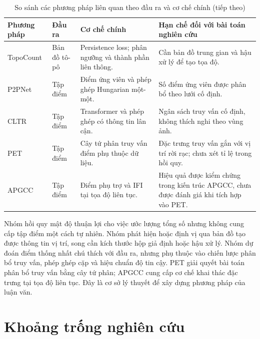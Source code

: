 \begin{table}[p]
\centering
\caption{So sánh các phương pháp liên quan theo đầu ra và cơ chế chính (tiếp theo)}
\begingroup
\small\singlespacing
\setlength{\tabcolsep}{3pt}
\renewcommand{\arraystretch}{1.12}
\begin{tabular}{>{\raggedright\arraybackslash}p{2.25cm}>{\raggedright\arraybackslash}p{2.0cm}>{\raggedright\arraybackslash}p{4.0cm}>{\raggedright\arraybackslash}p{4.35cm}}
\toprule
\textbf{Phương pháp} & \textbf{Đầu ra} & \textbf{Cơ chế chính} & \textbf{Hạn chế đối với bài toán nghiên cứu} \\
\midrule
TopoCount \cite{abousamra2021topocount} & Bản đồ tô-pô & Persistence loss; phân ngưỡng và thành phần liên thông. & Cần bản đồ trung gian và hậu xử lý để tạo tọa độ. \\
P2PNet \cite{song2021p2pnet} & Tập điểm & Điểm ứng viên và phép ghép Hungarian một-một. & Số điểm ứng viên được phân bổ theo lưới cố định. \\
CLTR \cite{liang2022cltr} & Tập điểm & Transformer và phép ghép có thông tin lân cận. & Ngân sách truy vấn cố định, không thích nghi theo vùng ảnh. \\
PET \cite{liu2023pet} & Tập điểm & Cây tứ phân truy vấn điểm phụ thuộc dữ liệu. & Đặc trưng truy vấn gắn với vị trí rời rạc; chưa xét tỉ lệ trong hồi quy. \\
APGCC \cite{chen2024apgcc} & Tập điểm & Điểm phụ trợ và IFI tại tọa độ liên tục. & Hiệu quả được kiểm chứng trong kiến trúc APGCC, chưa được đánh giá khi tích hợp vào PET. \\
\bottomrule
\end{tabular}
\endgroup
\end{table}

Nhóm hồi quy mật độ thuận lợi cho việc ước lượng tổng số nhưng không cung cấp tập điểm một cách tự nhiên. Nhóm phát hiện hoặc định vị qua bản đồ tạo được thông tin vị trí, song cần kích thước hộp giả định hoặc hậu xử lý. Nhóm dự đoán điểm thống nhất chú thích với đầu ra, nhưng phụ thuộc vào chiến lược phân bổ truy vấn, phép ghép cặp và hiệu chuẩn độ tin cậy. PET giải quyết bài toán phân bổ truy vấn bằng cây tứ phân; APGCC cung cấp cơ chế khai thác đặc trưng tại tọa độ liên tục. Đây là cơ sở lý thuyết để xây dựng phương pháp của luận văn.

\section{Khoảng trống nghiên cứu}

